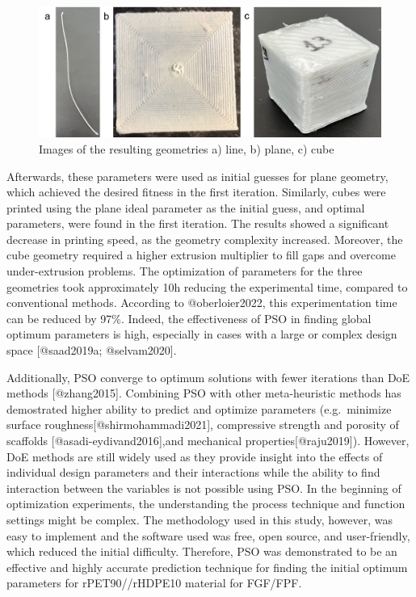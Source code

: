 \documentclass[
  letterpaper,
  DIV=11,
  numbers=noendperiod]{scrartcl}
\begin{document}
\begin{figure}

{\centering \includegraphics{figures/Figure_9_geometries.png}

}

\caption{\label{fig-geometries}Images of the resulting geometries a)
line, b) plane, c) cube}

\end{figure}

Afterwards, these parameters were used as initial guesses for plane
geometry, which achieved the desired fitness in the first iteration.
Similarly, cubes were printed using the plane ideal parameter as the
initial guess, and optimal parameters, were found in the first
iteration. The results showed a significant decrease in printing speed,
as the geometry complexity increased. Moreover, the cube geometry
required a higher extrusion multiplier to fill gaps and overcome
under-extrusion problems. The optimization of parameters for the three
geometries took approximately 10h reducing the experimental time,
compared to conventional methods. According to @oberloier2022, this
experimentation time can be reduced by 97\%. Indeed, the effectiveness
of PSO in finding global optimum parameters is high, especially in cases
with a large or complex design space {[}@saad2019a; @selvam2020{]}.

Additionally, PSO converge to optimum solutions with fewer iterations
than DoE methods {[}@zhang2015{]}. Combining PSO with other
meta-heuristic methods has demostrated higher ability to predict and
optimize parameters (e.g.~minimize surface
roughness{[}@shirmohammadi2021{]}, compressive strength and porosity of
scaffolds {[}@asadi-eydivand2016{]},and mechanical
properties{[}@raju2019{]}). However, DoE methods are still widely used
as they provide insight into the effects of individual design parameters
and their interactions while the ability to find interaction between the
variables is not possible using PSO. In the beginning of optimization
experiments, the understanding the process technique and function
settings might be complex. The methodology used in this study, however,
was easy to implement and the software used was free, open source, and
user-friendly, which reduced the initial difficulty. Therefore, PSO was
demonstrated to be an effective and highly accurate prediction technique
for finding the initial optimum parameters for rPET90//rHDPE10 material
for FGF/FPF.
\end{document}
